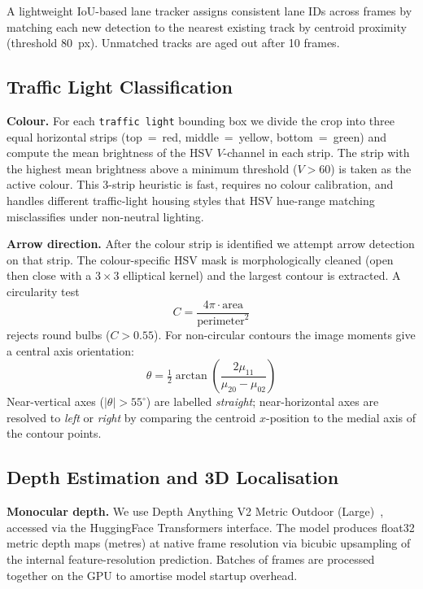 \documentclass[conference]{IEEEtran}
\begin{document}
A lightweight IoU-based lane tracker assigns consistent lane IDs across
frames by matching each new detection to the nearest existing track by
centroid proximity (threshold 80~px).  Unmatched tracks are aged out after
10 frames.

\subsection{Traffic Light Classification}

\textbf{Colour.}
For each \texttt{traffic light} bounding box we divide the crop into three
equal horizontal strips (top~=~red, middle~=~yellow, bottom~=~green) and
compute the mean brightness of the HSV $V$-channel in each strip.  The strip
with the highest mean brightness above a minimum threshold ($V > 60$) is
taken as the active colour.  This 3-strip heuristic is fast, requires no
colour calibration, and handles different traffic-light housing styles that
HSV hue-range matching misclassifies under non-neutral lighting.

\textbf{Arrow direction.}
After the colour strip is identified we attempt arrow detection on that strip.
The colour-specific HSV mask is morphologically cleaned (open then close with
a $3\times3$ elliptical kernel) and the largest contour is extracted.  A
circularity test
\begin{equation}
  C = \frac{4\pi \cdot \text{area}}{\text{perimeter}^2}
\end{equation}
rejects round bulbs ($C > 0.55$).  For non-circular contours the image
moments give a central axis orientation:
\begin{equation}
  \theta = \tfrac{1}{2}\arctan\!\left(\frac{2\mu_{11}}{\mu_{20} - \mu_{02}}\right)
\end{equation}
Near-vertical axes ($|\theta| > 55^\circ$) are labelled
\emph{straight}; near-horizontal axes are resolved to \emph{left} or
\emph{right} by comparing the centroid $x$-position to the medial axis
of the contour points.

\subsection{Depth Estimation and 3D Localisation}
\label{sec:depth}

\textbf{Monocular depth.}
We use Depth Anything V2 Metric Outdoor (Large)~\cite{li2024depthanything},
accessed via the HuggingFace Transformers interface.  The model produces
float32 metric depth maps (metres) at native frame resolution via bicubic
upsampling of the internal feature-resolution prediction.  Batches of frames
are processed together on the GPU to amortise model startup overhead.
\end{document}
